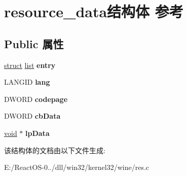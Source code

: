 \hypertarget{structresource__data}{}\section{resource\+\_\+data结构体 参考}
\label{structresource__data}
\subsection*{Public 属性}
\begin{DoxyCompactItemize}
\item 
\mbox{\label{structresource__data_a0bc8e024770f9df20df65b2e67d1cf37}} 
\hyperlink{interfacestruct}{struct} \hyperlink{classlist}{list} {\bfseries entry}
\item 
\mbox{\label{structresource__data_a2dc25ec9d5e83e56bfff20420296b0ae}} 
L\+A\+N\+G\+ID {\bfseries lang}
\item 
\mbox{\label{structresource__data_a043aa41dc2debb21f3df85c75a63effb}} 
D\+W\+O\+RD {\bfseries codepage}
\item 
\mbox{\label{structresource__data_ab499048d8838cd1d0a65932da5f9e2ef}} 
D\+W\+O\+RD {\bfseries cb\+Data}
\item 
\mbox{\label{structresource__data_a6cc62dd7605650a2bc83e0f782f5e62f}} 
\hyperlink{interfacevoid}{void} $\ast$ {\bfseries lp\+Data}
\end{DoxyCompactItemize}


该结构体的文档由以下文件生成\+:\begin{DoxyCompactItemize}
\item 
E\+:/\+React\+O\+S-\/0../dll/win32/kernel32/wine/res.\+c\end{DoxyCompactItemize}
